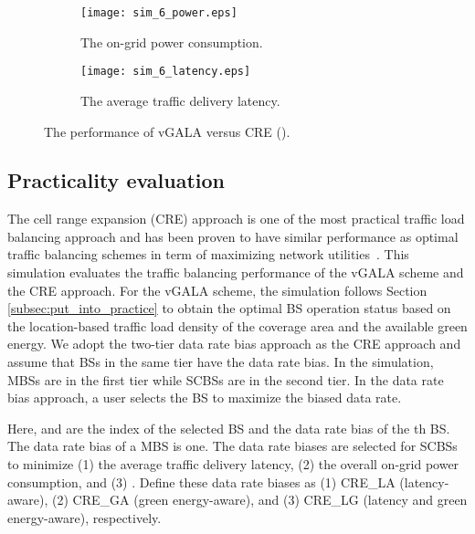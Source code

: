 \documentclass[journal]{IEEEtran}
\theoremstyle{definition}
\begin{document}
\begin{figure*}
\centering
\hspace*{\fill}
    \begin{subfigure}[b]{0.5\textwidth}
            \texttt{[image: sim\_6\_power.eps]}
            \caption{The on-grid power consumption.}
            \label{fig:sim_6_power}
    \end{subfigure}\begin{subfigure}[b]{0.5\textwidth}
            \texttt{[image: sim\_6\_latency.eps]}
            \caption{The average traffic delivery latency.}
            \label{fig:sim_6_latency}
   \end{subfigure}\hfill
       \caption{The performance of vGALA versus CRE ().
     }\label{fig:sim_6_power_latency}
\vspace{-16pt}
\end{figure*}

\subsection{Practicality evaluation}
The cell range expansion (CRE) approach is one of the most practical traffic load balancing approach and has been proven to have similar performance as optimal traffic balancing schemes in term of maximizing network utilities~\cite{Andrews:2014:AOLB,Ye:2013:UAL}.
This simulation evaluates the traffic balancing performance of the vGALA scheme and the CRE approach.
For the vGALA scheme, the simulation follows Section \ref{subsec:put_into_practice} to obtain the optimal BS operation status based on the location-based traffic load density of the coverage area and the available green energy. We adopt the two-tier data rate bias approach as the CRE approach and assume that BSs in the same tier have the data rate bias. In the simulation, MBSs are in the first tier while SCBSs are in the second tier. In the data rate bias approach, a user selects the BS to maximize the biased data rate.

Here,  and  are the index of the selected BS and the data rate bias of the th BS. The data rate bias of a MBS is one. The data rate biases are selected for SCBSs to minimize (1) the average traffic delivery latency, (2) the overall on-grid power consumption, and (3) . Define these data rate biases as (1) CRE\_LA (latency-aware), (2) CRE\_GA (green energy-aware), and (3) CRE\_LG (latency and green energy-aware), respectively.
\end{document}
